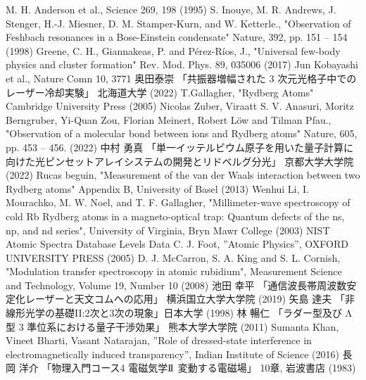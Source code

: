 \begin{thebibliography}{99}
M. H. Anderson et al., Science 269, 198 (1995)
S. Inouye, M. R. Andrews, J. Stenger, H.-J. Miesner, D. M. Stamper-Kurn, and W. Ketterle., "Observation of Feshbach resonances in a Bose-Einstein condensate" Nature, 392, pp. 151 – 154 (1998)
Greene, C. H., Giannakeas, P. and Pérez-Ríos, J., "Universal few-body physics and cluster formation" Rev. Mod. Phys. 89, 035006 (2017)
Jun Kobayashi et al., Nature Comn 10, 3771
奥田泰崇 「共振器増幅された 3 次元光格子中でのレーザー冷却実験」 北海道大学 (2022)
T.Gallagher, "Rydberg Atoms" Cambridge University Press (2005)
Nicolas Zuber, Viraatt S. V. Anasuri, Moritz Berngruber, Yi-Quan Zou, Florian Meinert, Robert Löw and Tilman Pfau., "Observation of a molecular bond between ions and Rydberg atoms"  Nature, 605, pp. 453 – 456. (2022)
中村 勇真 「単一イッテルビウム原子を用いた量子計算に向けた光ピンセットアレイシステムの開発とリドベルグ分光」 京都大学大学院　(2022)
Rucas beguin, "Measurement of the van der Waals interaction between two Rydberg atoms" Appendix B, University of Basel (2013)
Wenhui Li, I. Mourachko, M. W. Noel, and T. F. Gallagher, "Millimeter-wave spectroscopy of cold Rb Rydberg atoms in a magneto-optical trap: Quantum defects of the ns, np, and nd series", University of Virginia, Bryn Mawr College (2003)
NIST Atomic Spectra Database Levels Data
C. J. Foot, ”Atomic Physics”, OXFORD UNIVERSITY PRESS (2005)
D. J. McCarron, S. A. King and S. L. Cornish, "Modulation transfer spectroscopy in atomic rubidium", Measurement Science and Technology, Volume 19, Number 10 (2008)
池田 幸平 「通信波長帯周波数安定化レーザーと天文コムへの応用」 横浜国立大学大学院 (2019)
矢島 達夫 「非線形光学の基礎II:2次と3次の現象」日本大学 (1998)
林 暢仁 「ラダー型及び Λ 型 3 準位系における量子干渉効果」 熊本大学大学院 (2011)
Sumanta Khan, Vineet Bharti, Vasant Natarajan, ”Role of dressed-state interference in electromagnetically induced transparency”, Indian Institute of Science (2016)
長岡 洋介 「物理入門コース4 電磁気学$\mathrm{I}\hspace{-1.2pt}\mathrm{I}$ 変動する電磁場」 10章, 岩波書店 (1983)


\end{thebibliography}
